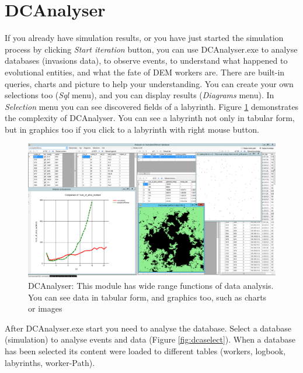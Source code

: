 \documentclass[a4paper,12pt]{article}
\begin{document}
\section{DCAnalyser}


If you already have simulation results, or you have just started the simulation process by clicking \textit{Start iteration} button, you can use DCAnalyser.exe to analyse databases (invasions data), to observe events, to understand what happened to evolutional entities, and what the fate of DEM workers are. There are built-in queries, charts and picture to help your understanding. You can create your own selections too (\textit{Sql} menu), and you can display results (\textit{Diagrams} menu). In \textit{Selection} menu you can see discovered fields of a labyrinth. Figure \ref{fig:analyser} demonstrates the complexity of DCAnalyser. You can see a labyrinth not only in tabular form, but in graphics too if you click to a labyrinth with right mouse button.


\begin{figure}
	\begin{center}
		\includegraphics[width=15cm]{analyser1.png}
		\caption{DCAnalyser: This module has wide range functions of data analysis. You can see data in tabular form, and graphics too, such as charts or images}
		\label{fig:analyser}
	\end{center}
\end{figure}


After DCAnalyser.exe start you need to analyse the database. Select a database (simulation) to analyse events and data (Figure \ref{fig:dcaselect}). When a database has been selected its content were loaded to different tables (workers, logbook, labyrinths, worker-Path). 
\end{document}
